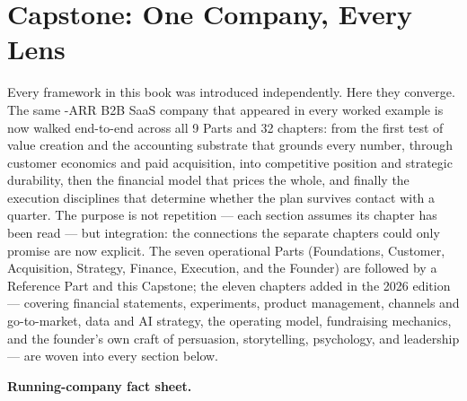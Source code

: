 \chapter{Capstone: One Company, Every Lens}\label{ch:capstone}


Every framework in this book was introduced independently. Here they converge. The same
-ARR B2B SaaS company that appeared in every worked example is now walked
end-to-end across all 9 Parts and 32 chapters: from the first test of value creation and the
accounting substrate that grounds every number, through customer economics and paid acquisition,
into competitive position and strategic durability, then the financial model that prices the
whole, and finally the execution disciplines that determine whether the plan survives contact
with a quarter. The purpose is not repetition --- each section assumes its chapter has been
read --- but integration: the connections the separate chapters could only promise are now
explicit. The seven operational Parts (Foundations, Customer, Acquisition, Strategy, Finance,
Execution, and the Founder) are followed by a Reference Part and this Capstone; the eleven
chapters added in the 2026 edition --- covering financial statements, experiments, product
management, channels and go-to-market, data and AI strategy, the operating model, fundraising
mechanics, and the founder's own craft of persuasion, storytelling, psychology, and leadership
--- are woven into every section below.

\medskip
\noindent\textbf{Running-company fact sheet.}

